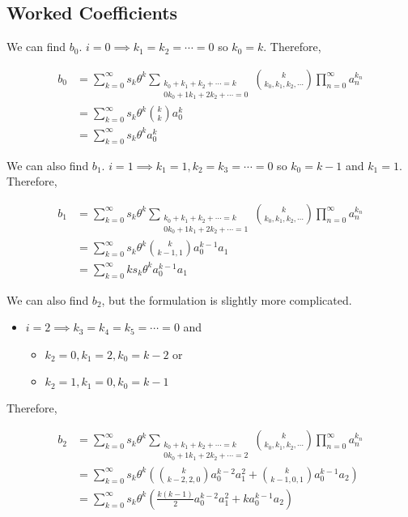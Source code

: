 \subsection{Worked Coefficients}

We can find $b_0$. $i = 0 \implies k_1 = k_2 = \cdots = 0$ so $k_0 = k$. Therefore,

\begin{align*}
    b_0 
    &= \sum_{k=0}^{\infty} s_k \theta^k \sum_{\substack{k_0 + k_1 + k_2 + \cdots = k \\ 0 k_0 + 1 k_1 + 2 k_2 + \cdots = 0}} \binom{k}{k_0, k_1, k_2, \cdots} \prod_{n=0}^{\infty} a_n^{k_n} \\
    &= \sum_{k=0}^{\infty} s_k \theta^k \binom{k}{k} a_0^{k} \\
    &= \sum_{k=0}^{\infty} s_k \theta^k a_0^k
\end{align*}

We can also find $b_1$. $i = 1 \implies k_1 = 1, k_2 = k_3 = \cdots = 0$ so $k_0 = k - 1$ and $k_1 = 1$. Therefore,

\begin{align*}
    b_1
    &= \sum_{k=0}^{\infty} s_k \theta^k \sum_{\substack{k_0 + k_1 + k_2 + \cdots = k \\ 0 k_0 + 1 k_1 + 2 k_2 + \cdots = 1}} \binom{k}{k_0, k_1, k_2, \cdots} \prod_{n=0}^{\infty} a_n^{k_n} \\
    &= \sum_{k=0}^{\infty} s_k \theta^k \binom{k}{k - 1, 1} a_0^{k - 1} a_1 \\
    &= \sum_{k=0}^{\infty} k s_k \theta^k a_0^{k-1} a_1
\end{align*}

We can also find $b_2$, but the formulation is slightly more complicated. 

\begin{itemize}
    \item $i = 2 \implies k_3 = k_4 = k_5 = \cdots = 0$ and
    \begin{itemize}
        \item $k_2 = 0, k_1 = 2, k_0 = k - 2$ or
        \item $k_2 = 1, k_1 = 0, k_0 = k - 1$
    \end{itemize}
\end{itemize}

Therefore,

\begin{align*}
    b_2
    &= \sum_{k=0}^{\infty} s_k \theta^k \sum_{\substack{k_0 + k_1 + k_2 + \cdots = k \\ 0 k_0 + 1 k_1 + 2 k_2 + \cdots = 2}} \binom{k}{k_0, k_1, k_2, \cdots} \prod_{n=0}^{\infty} a_n^{k_n} \\
    &= \sum_{k=0}^{\infty} s_k \theta^k \left(\binom{k}{k - 2, 2, 0}a_0^{k-2} a_1^{2} + \binom{k}{k - 1, 0, 1}a_0^{k-1} a_2\right) \\
    &= \sum_{k=0}^{\infty} s_k \theta^k \left(\frac{k(k-1)}{2} a_0^{k-2}a_1^{2} + k a_0^{k-1}a_2\right)
\end{align*}

